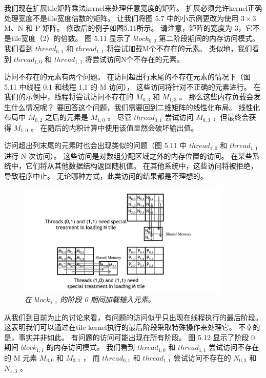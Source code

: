 我们现在扩展tile矩阵乘法kernel来处理任意宽度的矩阵。 扩展必须允许kernel正确处理宽度不是tile宽度倍数的矩阵。 
让我们将图 5.7 中的小示例更改为使用 $3 \times 3$ M、N 和 P 矩阵。 修改后的例子如图5.11所示。 
请注意，矩阵的宽度为 3，它不是tile宽度（2）的倍数。 图 5.11 显示了 $block_{0,0}$ 第二阶段期间的内存访问模式。 
我们看到 $thread_{0,1}$ 和 $thread_{1,1}$ 将尝试加载M个不存在的元素。 
类似地，我们看到 $thread_{1,0}$ 和 $thread_{1,1}$ 将尝试访问N个不存在的元素。

访问不存在的元素有两个问题。 在访问超出行末尾的不存在元素的情况下（图 5.11 中线程 0,1 和线程 1,1 的 M 访问），
这些访问将针对不正确的元素进行。 在我们的示例中，线程将尝试访问不存在的 $M_{0,3}$ 和 $M_{1,3}$ 。 
那么这些内存负载会发生什么情况呢？ 要回答这个问题，我们需要回到二维矩阵的线性化布局。 
线性化布局中 $M_{0,2}$ 之后的元素是 $M_{1,0}$ 。 
尽管 $thread_{0,1}$ 尝试访问 $M_{0,3}$ ，但最终会获得 $M_{1,0}$ 。 
在随后的内积计算中使用该值显然会破坏输出值。

访问超出列末尾的元素时也会出现类似的问题（图 5.11 中 $thread_{1,0}$ 和 $thread_{1,1}$ 进行 N 次访问）。 
这些访问是对数组分配区域之外的内存位置的访问。 在某些系统中，它们将从其他数据结构返回随机值。 
在其他系统中，这些访问将被拒绝，导致程序中止。 无论哪种方式，此类访问的结果都是不理想的。

\begin{figure}[H]
	\centering
	\includegraphics[width=0.9\textwidth]{figs/F5.12.png}
	\caption{\textit{在 $block_{1,1}$ 的阶段 0 期间加载输入元素。}}
\end{figure}

从我们到目前为止的讨论来看，有问题的访问似乎只出现在线程执行的最后阶段。 
这表明我们可以通过在tile kernel执行的最后阶段采取特殊操作来处理它。 不幸的是，事实并非如此。 
有问题的访问可能出现在所有阶段。 图 5.12 显示了阶段 0 期间 $block_{1,1}$ 的内存访问模式。
我们看到 $thread_{1,0}$ 和 $thread_{1,1}$ 尝试访问不存在的 M 元素 $M_{3,0}$ 和 $M_{3,1}$ ，
而 $thread_{0,1}$ 和 $thread_{1,1}$ 尝试访问不存在的 $N_{0,3}$ 和 $N_{1,3}$ 。

